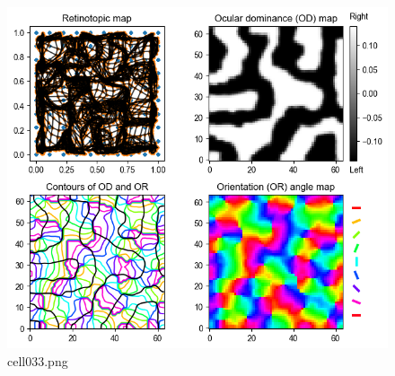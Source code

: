 \begin{figure}[ht]
	\centering
	\includegraphics[scale=0.8, max width=\linewidth]{./fig/local-learning-rule/self-organizing-map/cell033.png}
	\caption{cell033.png}
	\label{cell033.png}
\end{figure}